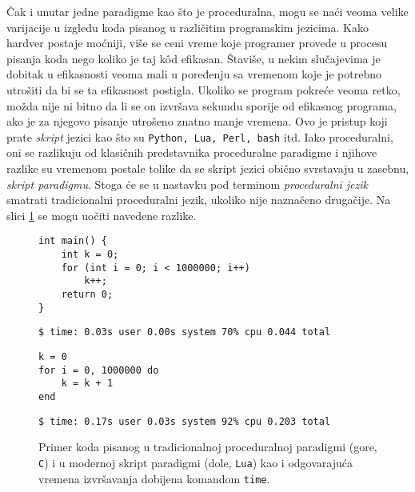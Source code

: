 Čak i unutar jedne paradigme kao što je proceduralna, mogu se naći veoma velike varijacije u izgledu koda pisanog u različitim programskim jezicima. Kako hardver postaje moćniji, više se ceni vreme koje programer provede u procesu pisanja koda nego koliko je taj k\^od efikasan. Štaviše, u nekim slučajevima je dobitak u efikasnosti veoma mali u poređenju sa vremenom koje je potrebno utrošiti da bi se ta efikasnost postigla. Ukoliko se program pokreće veoma retko, možda nije ni bitno da li se on izvršava sekundu sporije od efikasnog programa, ako je za njegovo pisanje utrošeno znatno manje vremena. Ovo je pristup koji prate \emph{skript} jezici kao što su \texttt{Python, Lua, Perl, bash} itd. Iako proceduralni, oni se razlikuju od klasičnih predstavnika proceduralne paradigme i njihove razlike su vremenom postale tolike da se skript jezici obično svrstavaju u zasebnu, \emph{skript paradigmu}. Stoga će se u nastavku pod terminom \emph{proceduralni jezik} smatrati tradicionalni proceduralni jezik, ukoliko nije naznačeno drugačije. Na slici \ref{fig:LanguagesDiff} se mogu uočiti navedene razlike.

\begin{figure}[h!]
\begin{lstlisting}
int main() {
    int k = 0;
    for (int i = 0; i < 1000000; i++)
        k++;
    return 0;
}
\end{lstlisting}
\begin{lstlisting}[language={}]
$ time: 0.03s user 0.00s system 70% cpu 0.044 total
\end{lstlisting}
\begin{lstlisting}
k = 0
for i = 0, 1000000 do 
    k = k + 1 
end
\end{lstlisting}
\begin{lstlisting}[language={}]
$ time: 0.17s user 0.03s system 92% cpu 0.203 total
\end{lstlisting}
\caption{Primer koda pisanog u tradicionalnoj proceduralnoj paradigmi (gore, \texttt{C}) i u modernoj skript paradigmi (dole, \texttt{Lua}) kao i odgovarajuća vremena izvršavanja dobijena komandom \texttt{time}.}
\label{fig:LanguagesDiff}
\end{figure}

